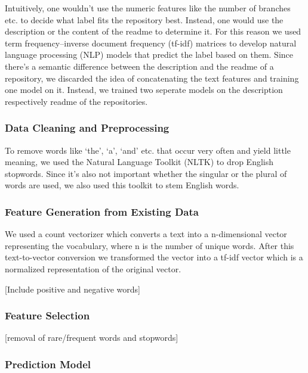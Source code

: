 \documentclass[%
a4paper,
DIV12,
2.5headlines,
bigheadings,
titlepage,
openbib,
]{scrartcl}
\begin{document}
Intuitively, one wouldn't use the numeric features like the number of branches etc. to decide what label fits the repository best.
Instead, one would use the description or the content of the readme to determine it.
For this reason we used term frequency--inverse document frequency (tf-idf) matrices to develop natural language processing (NLP) models that predict the label based on them.
Since there's a semantic difference between the description and the readme of a repository, we discarded the idea of concatenating the text features and training one model on it.
Instead, we trained two seperate models on the description respectively readme of the repositories.

\subsubsection{Data Cleaning and
Preprocessing}\label{data-cleaning-and-preprocessing-1}

To remove words like `the', `a', `and' etc. that occur very often and yield little meaning, we used the Natural Language Toolkit (NLTK) to drop English stopwords.
Since it's also not important whether the singular or the plural of words are used, we also used this toolkit to stem English words.

\subsubsection{Feature Generation from Existing
Data}\label{feature-generation-from-existing-data}

We used a count vectorizer which converts a text into a n-dimensional vector representing the vocabulary, where n is the number of unique words.
After this text-to-vector conversion we transformed the vector into a tf-idf vector which is a normalized representation of the original vector.

[Include positive and negative words]

\subsubsection{Feature Selection}\label{feature-selection-1}

{[}removal of rare/frequent words and stopwords{]}

\subsubsection{Prediction Model}\label{prediction-model-1}
\end{document}
